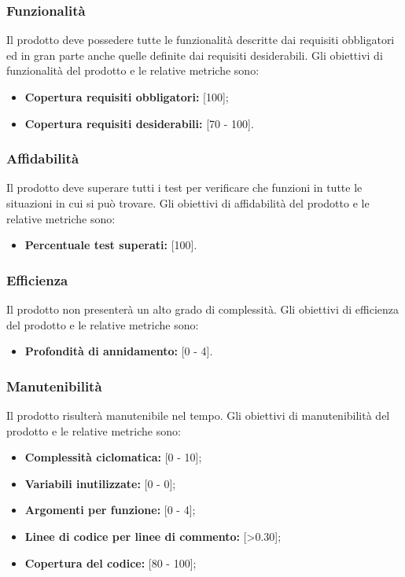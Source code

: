 \subsubsection{Funzionalità} Il prodotto deve possedere tutte le funzionalità descritte dai requisiti obbligatori ed in gran parte anche quelle definite dai requisiti desiderabili. Gli obiettivi di funzionalità del prodotto e le relative metriche sono:
\begin{itemize}
\item \textbf{Copertura requisiti obbligatori: }[100];
\item \textbf{Copertura requisiti desiderabili: }[70 - 100].
\end{itemize}

\subsubsection{Affidabilità} Il prodotto deve superare tutti i test per verificare che funzioni in tutte le situazioni in cui si può trovare.
Gli obiettivi di affidabilità del prodotto e le relative metriche sono:
\begin{itemize}
\item \textbf{Percentuale test superati: }[100].
\end{itemize}

\subsubsection{Efficienza} Il prodotto non presenterà un alto grado di complessità. 
Gli obiettivi di efficienza del prodotto e le relative metriche sono:
\begin{itemize}
\item \textbf{Profondità di annidamento: }[0 - 4].
\end{itemize}

\subsubsection{Manutenibilità} Il prodotto risulterà manutenibile nel tempo. 
Gli obiettivi di manutenibilità del prodotto e le relative metriche sono:
\begin{itemize}
\item \textbf{Complessità ciclomatica: }[0 - 10];
\item \textbf{Variabili inutilizzate: }[0 - 0];
\item \textbf{Argomenti per funzione: }[0 - 4];
\item \textbf{Linee di codice per linee di commento: }[>0.30];
\item \textbf{Copertura del codice: }[80 - 100];
\end{itemize}



